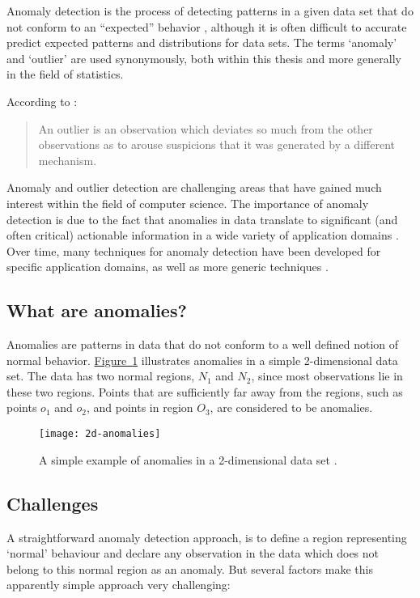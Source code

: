 Anomaly detection is the process of detecting patterns in a given data set that 
do not conform to an ``expected'' behavior \cite{Chandola:2007}, although it is
often difficult to accurate predict expected patterns and distributions for data
sets. The terms `anomaly' and `outlier' are used synonymously, both within this 
thesis and more generally in the field of statistics.

According to \citeauthor{Hawkins:1980} \cite{Hawkins:1980}:
\begin{quote}
An outlier is an observation which deviates so much from the other observations 
as to arouse suspicions that it was generated by a different mechanism.
\end{quote}

Anomaly and outlier detection are challenging areas that have gained much 
interest within the field of computer science. The importance of anomaly 
detection is due to the fact that anomalies in data translate to significant 
(and often critical) actionable information in a wide variety of application 
domains \cite{Chandola:2007}. Over time, many techniques for anomaly detection 
have been developed for specific application domains, as well as more generic 
techniques \cite{Chandola:2007}.

\subsection{What are anomalies?}
\label{sec:whatAreAnomalies}
Anomalies are patterns in data that do not conform to a well defined notion of
normal behavior. \hyperref[fig:2d-anomalies]{Figure~\ref{fig:2d-anomalies}} 
illustrates anomalies in a simple 2-dimensional data set. The data has two 
normal regions, $N_{1}$ and $N_{2}$, since most observations lie in these two 
regions. Points that are sufficiently far away from the regions, such as points 
$o_{1}$ and $o_{2}$, and points in region $O_{3}$, are considered to be 
anomalies.

\begin{figure}
	\centering
	\texttt{[image: 2d-anomalies]}
	\caption[A simple example of anomalies in a 2-dimensional data set.]{A
		simple example of anomalies in a 2-dimensional data set 
		\cite{Chandola:2007}.}
	\label{fig:2d-anomalies}
\end{figure}

\subsection{Challenges}
\label{sec:anomalyDetectionChallenges}
A straightforward anomaly detection approach, is to define a region representing
`normal' behaviour and declare any observation in the data which does not belong
to this normal region as an anomaly. But several factors make this apparently 
simple approach very challenging:

